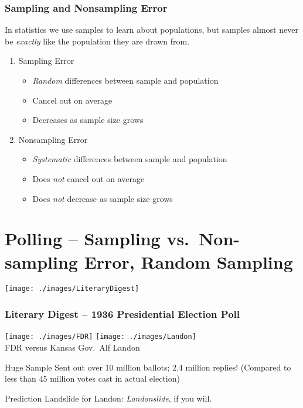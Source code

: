 \begin{frame}
\frametitle{Sampling and Nonsampling Error}
In statistics we use samples to learn about populations, but samples almost never be \emph{exactly} like the population they are drawn from.
	\begin{enumerate}
		\item Sampling Error 
			\begin{itemize}
				\item \emph{Random} differences between sample and population
				\item Cancel out on average
				\item Decreases as sample size grows
			\end{itemize}
		\item Nonsampling Error
			\begin{itemize}
				\item \emph{Systematic} differences between sample and population 
				\item Does \emph{not} cancel out on average
				\item Does \emph{not} decrease as sample size grows
			\end{itemize}
	\end{enumerate}
\end{frame}



\section{Polling -- Sampling vs.\ Non-sampling Error, Random Sampling}

\begin{frame}
\begin{center}
\texttt{[image: ./images/LiteraryDigest]}
\end{center}

\end{frame}

\begin{frame}

\frametitle{Literary Digest -- 1936 Presidential Election Poll}

\begin{center}
\texttt{[image: ./images/FDR]}
\texttt{[image: ./images/Landon]}\\
\small FDR versus Kansas Gov.\ Alf Landon
\end{center}

\normalsize

\begin{block}{Huge Sample}
Sent out over 10 million ballots; 2.4 million replies! (Compared to  less than $45$ million votes cast in actual election)
\end{block}

\begin{block}{Prediction}
Landslide for Landon: \emph{Landonslide},  if you will.
\end{block}
\end{frame}

